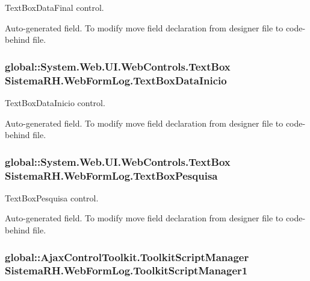 TextBoxDataFinal control. 

Auto-\/generated field. To modify move field declaration from designer file to code-\/behind file. \hypertarget{class_sistema_r_h_1_1_web_form_log_a1ecc5ff7da62cca489aa8fc7a67ef093}{
\subsubsection[{TextBoxDataInicio}]{\setlength{\rightskip}{0pt plus 5cm}global::System.Web.UI.WebControls.TextBox {\bf SistemaRH.WebFormLog.TextBoxDataInicio}}}
\label{class_sistema_r_h_1_1_web_form_log_a1ecc5ff7da62cca489aa8fc7a67ef093}


TextBoxDataInicio control. 

Auto-\/generated field. To modify move field declaration from designer file to code-\/behind file. \hypertarget{class_sistema_r_h_1_1_web_form_log_adfb04da26612dd2d1f2e35b5363422bb}{
\subsubsection[{TextBoxPesquisa}]{\setlength{\rightskip}{0pt plus 5cm}global::System.Web.UI.WebControls.TextBox {\bf SistemaRH.WebFormLog.TextBoxPesquisa}}}
\label{class_sistema_r_h_1_1_web_form_log_adfb04da26612dd2d1f2e35b5363422bb}


TextBoxPesquisa control. 

Auto-\/generated field. To modify move field declaration from designer file to code-\/behind file. \hypertarget{class_sistema_r_h_1_1_web_form_log_a4d4defd71dc13bad20e662b952d41987}{
\subsubsection[{ToolkitScriptManager1}]{\setlength{\rightskip}{0pt plus 5cm}global::AjaxControlToolkit.ToolkitScriptManager {\bf SistemaRH.WebFormLog.ToolkitScriptManager1}}}
\label{class_sistema_r_h_1_1_web_form_log_a4d4defd71dc13bad20e662b952d41987}


